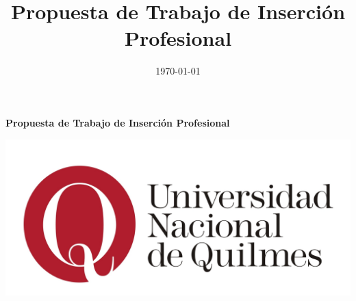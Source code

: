 \documentclass[a4paper,10pt]{article}
\title{Propuesta de Trabajo de Inserción Profesional}
\date{\today}
\begin{document}
\begin{titlepage}

\newcommand{\HRule}{\rule{\linewidth}{0.5mm}} %

\center %




{ \huge \bfseries Propuesta de Trabajo de Inserción Profesional}\\[0.4cm] %

\bigskip
\bigskip
\bigskip
\bigskip
\bigskip
\bigskip
 


\bigskip
\bigskip
\bigskip

\includegraphics[width=\textwidth,height=\textheight,keepaspectratio]{assets/logo-unq.jpg}\\[1cm]

\end{titlepage}

\maketitle




\printbibliography
\end{document}
